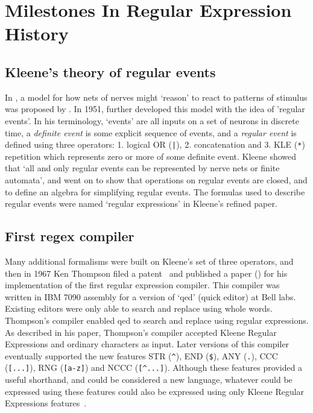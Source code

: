 \section{Milestones In Regular Expression History}

\subsection{Kleene's theory of regular events}
In \citeyear{McCulloch1943Logical}, a model for how nets of nerves might `reason' to react to patterns of stimulus was proposed by \citeauthor{McCulloch1943Logical}.  In 1951, \citeauthor{Kleene1951RAND} further developed this model with the idea of 'regular events'.  In his terminology, `events' are all inputs on a set of neurons in discrete time, a \emph{definite event} is some explicit sequence of events, and a \emph{regular event} is defined using three operators: 1. logical OR (\verb!|!), 2. concatenation and 3. KLE (\verb!*!) repetition which represents zero or more of some definite event.  Kleene showed that `all and only regular events can be represented by nerve nets or finite automata', and went on to show that operations on regular events are closed, and to define an algebra for simplifying regular events.  The formulas used to describe regular events were named `regular expressions' in Kleene's \citeyear{kleene56} refined paper.

\subsection{First regex compiler}
Many additional formalisms were built on Kleene's set of three operators, and then in 1967 Ken Thompson filed a patent~\cite{ThompsonBell1971} and published a paper (\citeyear{Thompson:1968:PTR:363347.363387}) for his implementation of the first regular expression compiler.  This compiler was written in IBM 7090 assembly for a version of `qed' (quick editor) at Bell labs.  Existing editors were only able to search and replace using whole words.  Thompson's compiler  enabled qed to search and replace using regular expressions.  As described in his paper, Thompson's compiler accepted Kleene Regular Expressions and ordinary characters as input.  Later versions of this compiler eventually supported the new features STR (\verb!^!), END (\verb!$!), ANY (\verb!.!), CCC (\verb![...]!), RNG (\verb![a-z]!) and NCCC (\verb![^...]!).  Although these features provided a useful shorthand, and could be considered a new language, whatever could be expressed using these features could also be expressed using only Kleene Regular Expressions features~\citep{Hopcroft:2006:IAT:1196416}.

